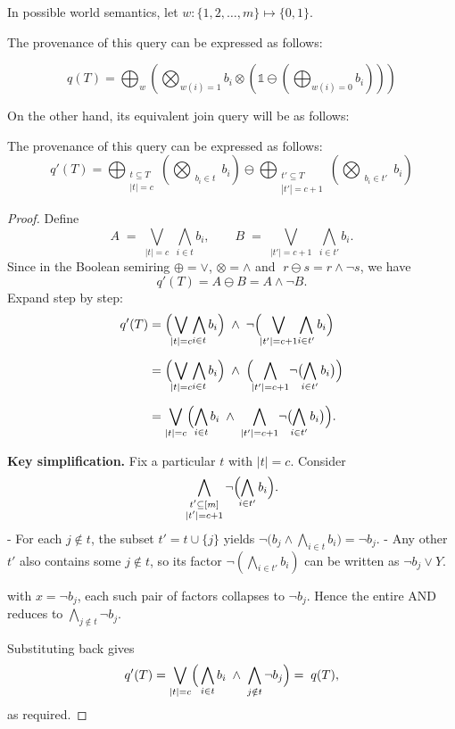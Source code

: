 In possible world semantics, let $w: \{1,2,\dots,m\} \mapsto \{0,1\}$.

The provenance of this query can be expressed as follows:

$$q(T) = \bigoplus_{w}\left(\bigotimes_{w(i)=1}b_i\otimes\left(\mathbb{1}\ominus(\bigoplus_{w(i) =0}b_i)\right)\right)$$

On the other hand, its equivalent join query will be as follows:

The provenance of this query can be expressed as follows:
\[
q'(T) = \bigoplus_{\substack{t\subseteq T \\ |t| = c}}\left(\bigotimes_{\substack{b_i\in t}}b_i\right) \ominus \bigoplus_{\substack{t'\subseteq T \\ |t'| = c+1}}\left(\bigotimes_{\substack{b_i\in t'}}b_i\right)
\]

\begin{proof}
Define
\[
A \;=\; \bigvee_{\lvert t\rvert = c}\;\bigwedge_{i\in t} b_i,
\qquad
B \;=\; \bigvee_{\lvert t'\rvert = c+1}\;\bigwedge_{i\in t'} b_i.
\]
Since in the Boolean semiring \(\oplus=\vee\), \(\otimes=\wedge\) and
\(\;r\ominus s = r\wedge\neg s\), we have
\[
q'(T)
= A \ominus B
= A \wedge \neg B.
\]
Expand step by step:
\begin{align*}
q'(T)
&= \Bigl(\!\bigvee_{\lvert t\rvert = c}\!\bigwedge_{i\in t}b_i\Bigr)
   \;\wedge\;
   \neg\Bigl(\!\bigvee_{\lvert t'\rvert = c+1}\!\bigwedge_{i\in t'}b_i\Bigr)\\[6pt]
&= \Bigl(\!\bigvee_{\lvert t\rvert = c}\!\bigwedge_{i\in t}b_i\Bigr)
   \;\wedge\;
   \Bigl(\!\bigwedge_{\lvert t'\rvert = c+1}\!\neg\bigl(\!\bigwedge_{i\in t'}b_i\bigr)\Bigr)\\[6pt]
&= \bigvee_{\lvert t\rvert = c}
    \Bigl(
      \bigwedge_{i\in t}b_i
      \;\wedge\;
      \bigwedge_{|t'|=c+1}\!\neg\bigl(\!\bigwedge_{i\in t'}b_i\bigr)
    \Bigr).
\end{align*}

\textbf{Key simplification.}  Fix a particular \(t\) with \(\lvert t\rvert=c\).  Consider
\[
\bigwedge_{\substack{t'\subseteq[m]\\|t'|=c+1}}
\neg\Bigl(\!\bigwedge_{i\in t'}b_i\Bigr).
\]
- For each \(j\notin t\), the subset \(t'=t\cup\{j\}\) yields
  \(\neg\bigl(b_j\wedge\bigwedge_{i\in t}b_i\bigr)=\neg b_j\).  
- Any other \(t'\) also contains some \(j\notin t\), so its factor
  \(\neg(\bigwedge_{i\in t'}b_i)\) can be written as
  \(\neg b_j\vee Y\).  

with \(x=\neg b_j\), each such pair of factors collapses to \(\neg b_j\).  Hence the entire
AND reduces to
\(\bigwedge_{j\notin t}\neg b_j\).

Substituting back gives
\[
q'(T)
=\bigvee_{\lvert t\rvert = c}
\Bigl(\,\bigwedge_{i\in t}b_i
       \;\wedge\;
       \bigwedge_{j\notin t}\neg b_j
\Bigr)
=\;q(T),
\]
as required.
\end{proof}
